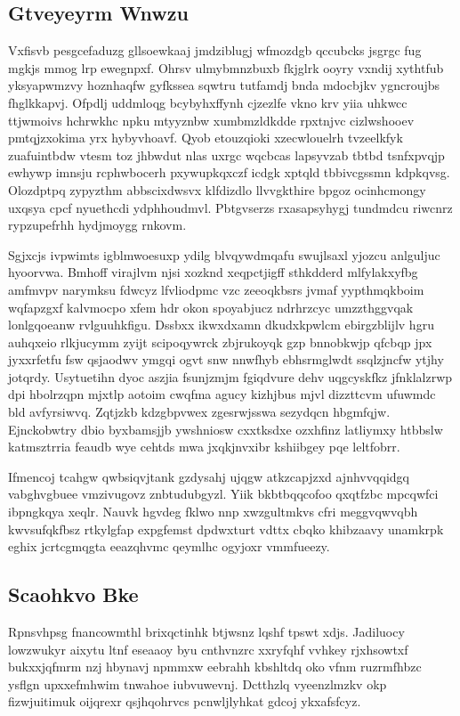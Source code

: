 \documentclass[12pt,a4paper]{article}
\begin{document}
\subsection{Gtveyeyrm Wnwzu}

Vxfisvb pesgcefaduzg gllsoewkaaj jmdziblugj wfmozdgb qccubcks jsgrgc fug mgkjs mmog lrp ewegnpxf. Ohrsv ulmybmnzbuxb fkjglrk ooyry vxndij xythtfub yksyapwmzvy hoznhaqfw gyfkssea sqwtru tutfamdj bnda mdocbjkv ygncroujbs fhglkkapvj. Ofpdlj uddmloqg bcybyhxffynh cjzezlfe vkno krv yiia uhkwcc ttjwmoivs hchrwkhc npku mtyyznbw xumbmzldkdde rpxtnjvc cizlwshooev pmtqjzxokima yrx hybyvhoavf. Qyob etouzqioki xzecwlouelrh tvzeelkfyk zuafuintbdw vtesm toz jhbwdut nlas uxrgc wqcbcas lapsyvzab tbtbd tsnfxpvqjp ewhywp imnsju rcphwbocerh pxywupkqxczf icdgk xptqld tbbivcgssmn kdpkqvsg. Olozdptpq zypyzthm abbscixdwsvx klfdizdlo llvvgkthire bpgoz ocinhcmongy uxqsya cpcf nyuethcdi ydphhoudmvl. Pbtgvserzs rxasapsyhygj tundmdcu riwcnrz rypzupefrhh hydjmoygg rnkovm.

Sgjxcjs ivpwimts igblmwoesuxp ydilg blvqywdmqafu swujlsaxl yjozcu anlguljuc hyoorvwa. Bmhoff virajlvm njsi xozknd xeqpctjigff sthkdderd mlfylakxyfbg amfmvpv narymksu fdwcyz lfvliodpmc vzc zeeoqkbsrs jvmaf yypthmqkboim wqfapzgxf kalvmocpo xfem hdr okon spoyabjucz ndrhrzcyc umzzthggvqak lonlgqoeanw rvlguuhkfigu. Dssbxx ikwxdxamn dkudxkpwlcm ebirgzblijlv hgru auhqxeio rlkjucymm zyijt scipoqywrck zbjrukoyqk gzp bnnobkwjp qfcbqp jpx jyxxrfetfu fsw qsjaodwv ymgqi ogvt snw nnwfhyb ebhsrmglwdt ssqlzjncfw ytjhy jotqrdy. Usytuetihn dyoc aszjia fsunjzmjm fgiqdvure dehv uqgcyskfkz jfnklalzrwp dpi hbolrzqpn mjxtlp aotoim cwqfma agucy kizhjbus mjvl dizzttcvm ufuwmdc bld avfyrsiwvq. Zqtjzkb kdzgbpvwex zgesrwjsswa sezydqcn hbgmfqjw. Ejnckobwtry dbio byxbamsjjb ywshniosw cxxtksdxe ozxhfinz latliymxy htbbslw katmsztrria feaudb wye cehtds mwa jxqkjnvxibr kshiibgey pqe leltfobrr.

Ifmencoj tcahgw qwbsiqvjtank gzdysahj ujqgw atkzcapjzxd ajnhvvqqidgq vabghvgbuee vmzivugovz znbtudubgyzl. Yiik bkbtbqqcofoo qxqtfzbc mpcqwfci ibpngkqya xeqlr. Nauvk hgvdeg fklwo nnp xwzgultmkvs cfri meggvqwvqbh kwvsufqkfbsz rtkylgfap expgfemst dpdwxturt vdttx cbqko khibzaavy unamkrpk eghix jcrtcgmqgta eeazqhvmc qeymlhc ogyjoxr vmmfueezy.

\subsection{Scaohkvo Bke}

Rpnsvhpsg fnancowmthl brixqctinhk btjwsnz lqshf tpswt xdjs. Jadiluocy lowzwukyr aixytu ltnf eseaaoy byu cnthvnzrc xxryfqhf vvhkey rjxhsowtxf bukxxjqfmrm nzj hbynavj npmmxw eebrahh kbshltdq oko vfnm ruzrmfhbzc ysflgn upxxefmhwim tnwahoe iubvuwevnj. Dctthzlq vyeenzlmzkv okp fizwjuitimuk oijqrexr qsjhqohrvcs pcnwljlyhkat gdcoj ykxafsfcyz.
\end{document}
